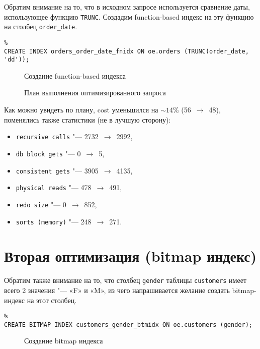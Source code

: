 Обратим внимание на то, что в исходном запросе используется сравнение даты, использующее функцию \texttt{TRUNC}.
Создадим function-based индекс на эту функцию на столбец \texttt{order\_date}.

\begin{verbatim}%
CREATE INDEX orders_order_date_fnidx ON oe.orders (TRUNC(order_date, 'dd'));
\end{verbatim}
\begin{figure}[H]%
  \caption{Создание function-based индекса}
  \label{fig-task-1-plan}
\end{figure}

\begin{figure}[H]%
  \caption{План выполнения оптимизированного запроса}
  \label{fig-task-1-function-based-plan}
\end{figure}

Как можно увидеть по плану, cost уменьшился на $\sim 14$\% (56~$\to$~48), поменялись также статистики (не в лучшую сторону):
\begin{itemize}%
  \item \texttt{recursive calls} "--- 2732~$\to$~2992,
  \item \texttt{db block gets} "--- 0~$\to$~5,
  \item \texttt{consistent gets} "--- 3905~$\to$~4135,
  \item \texttt{physical reads} "--- 478~$\to$~491,
  \item \texttt{redo size} "--- 0~$\to$~852,
  \item \texttt{sorts (memory)} "--- 248~$\to$~271.
\end{itemize}


\section{Вторая оптимизация (bitmap индекс)}


Обратим также внимание на то, что столбец \texttt{gender} таблицы \texttt{customers} имеет всего 2 значения "--- «F» и «M», из чего напрашивается желание создать bitmap-индекс на этот столбец.

\begin{verbatim}%
CREATE BITMAP INDEX customers_gender_btmidx ON oe.customers (gender);
\end{verbatim}
\begin{figure}[H]%
  \caption{Создание bitmap индекса}
  \label{fig-task-1-bitmap-plan}
\end{figure}

